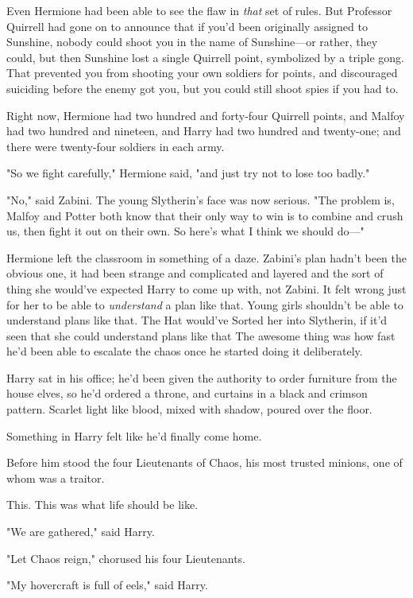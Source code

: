 Even Hermione had been able to see the flaw in \emph{that} set of rules. But
Professor Quirrell had gone on to announce that if you'd been originally
assigned to Sunshine, nobody could shoot you in the name of Sunshine---or
rather, they could, but then Sunshine lost a single Quirrell point, symbolized
by a triple gong. That prevented you from shooting your own soldiers for
points, and discouraged suiciding before the enemy got you, but you could still
shoot spies if you had to.

Right now, Hermione had two hundred and forty-four Quirrell points, and Malfoy
had two hundred and nineteen, and Harry had two hundred and twenty-one; and
there were twenty-four soldiers in each army.

"So we fight carefully," Hermione said, "and just try not to lose too badly."

"No," said Zabini. The young Slytherin's face was now serious. "The problem is,
Malfoy and Potter both know that their only way to win is to combine and crush
us, then fight it out on their own. So here's what I think we should do\mbox{---}"

Hermione left the classroom in something of a daze. Zabini's plan hadn't been
the obvious one, it had been strange and complicated and layered and the sort
of thing she would've expected Harry to come up with, not Zabini. It felt wrong
just for her to be able to \emph{understand} a plan like that. Young girls
shouldn't be able to understand plans like that. The Hat would've Sorted her
into Slytherin, if it'd seen that she could understand plans like that{\el}
\sbreak
The awesome thing was how fast he'd been able to escalate the chaos once he
started doing it deliberately.

Harry sat in his office; he'd been given the authority to order furniture from
the house elves, so he'd ordered a throne, and curtains in a black and crimson
pattern. Scarlet light like blood, mixed with shadow, poured over the floor.

Something in Harry felt like he'd finally come home.

Before him stood the four Lieutenants of Chaos, his most trusted minions, one
of whom was a traitor.

This. This was what life should be like.

"We are gathered," said Harry.

"Let Chaos reign," chorused his four Lieutenants.

"My hovercraft is full of eels," said Harry.

